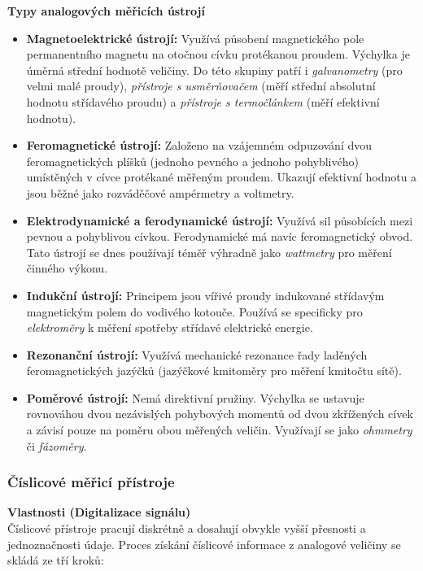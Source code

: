         \textbf{Typy analogových měřicích ústrojí}
            \begin{itemize}
                \item \textbf{Magnetoelektrické ústrojí:} Využívá působení magnetického pole permanentního magnetu na otočnou cívku protékanou proudem. Výchylka je úměrná střední hodnotě veličiny. Do této skupiny patří i \textit{galvanometry} (pro velmi malé proudy), \textit{přístroje s usměrňovačem} (měří střední absolutní hodnotu střídavého proudu) a \textit{přístroje s termočlánkem} (měří efektivní hodnotu).
                \item \textbf{Feromagnetické ústrojí:} Založeno na vzájemném odpuzování dvou feromagnetických plíšků (jednoho pevného a jednoho pohyblivého) umístěných v cívce protékané měřeným proudem. Ukazují efektivní hodnotu a jsou běžné jako rozváděčové ampérmetry a voltmetry.
                \item \textbf{Elektrodynamické a ferodynamické ústrojí:} Využívá sil působících mezi pevnou a pohyblivou cívkou. Ferodynamické má navíc feromagnetický obvod. Tato ústrojí se dnes používají téměř výhradně jako \textit{wattmetry} pro měření činného výkonu.
                \item \textbf{Indukční ústrojí:} Principem jsou vířivé proudy indukované střídavým magnetickým polem do vodivého kotouče. Používá se specificky pro \textit{elektroměry} k měření spotřeby střídavé elektrické energie.
                \item \textbf{Rezonanční ústrojí:} Využívá mechanické rezonance řady laděných feromagnetických jazýčků (jazýčkové kmitoměry pro měření kmitočtu sítě).
                \item \textbf{Poměrové ústrojí:} Nemá direktivní pružiny. Výchylka se ustavuje rovnováhou dvou nezávislých pohybových momentů od dvou zkřížených cívek a závisí pouze na poměru obou měřených veličin. Využívají se jako \textit{ohmmetry} či \textit{fázoměry}.
            \end{itemize}
    \subsubsection{Číslicové měřicí přístroje}
        \textbf{Vlastnosti (Digitalizace signálu)}\\
        Číslicové přístroje pracují diskrétně a dosahují obvykle vyšší přesnosti a jednoznačnosti údaje. Proces získání číslicové informace z analogové veličiny se skládá ze tří kroků:
        
